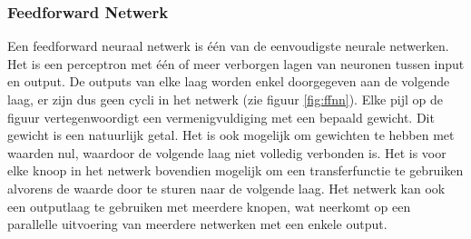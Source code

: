 \subsubsection{Feedforward Netwerk}
\label{par:concept}
Een feedforward neuraal netwerk is \'e\'en van de eenvoudigste neurale netwerken. Het is een perceptron met \'e\'en of meer verborgen lagen van neuronen tussen input en output. De outputs van elke laag worden enkel doorgegeven aan de volgende laag, er zijn dus geen cycli in het netwerk (zie figuur \ref{fig:ffnn}). Elke pijl op de figuur vertegenwoordigt een vermenigvuldiging met een bepaald gewicht. Dit gewicht is een natuurlijk getal. Het is ook mogelijk om gewichten te hebben met waarden nul, waardoor de volgende laag niet volledig verbonden is. Het is voor elke knoop in het netwerk bovendien mogelijk om een transferfunctie te gebruiken alvorens de waarde door te sturen naar de volgende laag. Het netwerk kan ook een outputlaag te gebruiken met meerdere knopen, wat neerkomt op een parallelle uitvoering van meerdere netwerken met een enkele output\cite{Bishop:1995:NNP:525960}.

